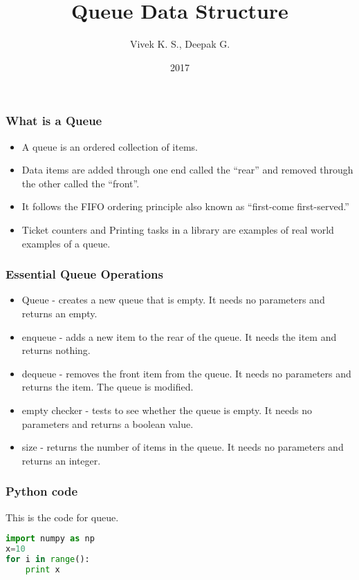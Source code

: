 \documentclass{beamer}
\title{Queue Data Structure}
\author{Vivek K. S., Deepak G.}
\institute{Information Systems Decision Sciences (ISDS)\\
MUMA College of Business\\
University of South Florida \\
Tampa, Florida}
\date{2017}
\begin{document}
 
\frame{\titlepage}
 
\begin{frame}
\frametitle{What is a Queue}
\begin{itemize}

\item A queue is an ordered collection of items.

\item Data items are added through one end called the “rear” and removed through the other called the “front”.


\item It follows the FIFO ordering principle also known as “first-come first-served.”
 

\item Ticket counters and Printing tasks in a library are examples of real world examples of a queue.



 

\end{itemize}
\end{frame}


\begin{frame}
\frametitle{Essential Queue Operations}

\begin{itemize}

\item Queue - creates a new queue that is empty. It needs no parameters and returns an empty.

\item enqueue - adds a new item to the rear of the queue. It needs the item and returns
nothing.

\item dequeue - removes the front item from the queue. It needs no parameters and returns the
item. The queue is modified.

\item empty checker - tests to see whether the queue is empty. It needs no parameters and returns a
boolean value.

\item size -  returns the number of items in the queue. It needs no parameters and returns an
integer.


\end{itemize}

\end{frame} 


\begin{frame}[fragile]
\frametitle{Python code}

This is the code for queue.
\begin{lstlisting}[language=Python]
import numpy as np
x=10
for i in range():
	print x
	
\end{lstlisting}

\end{frame}
\end{document}
